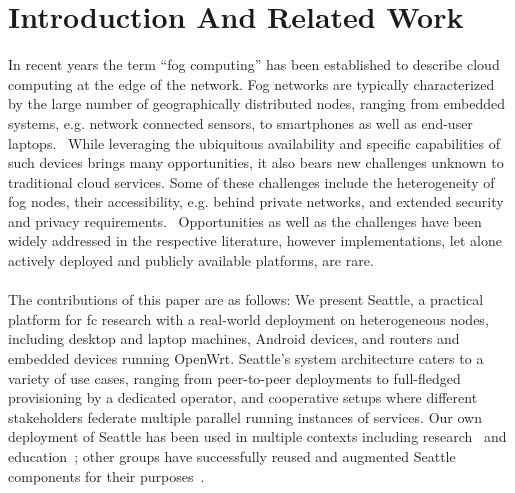 \section{Introduction And Related Work}
In recent years the term ``fog computing'' has been established to describe
cloud computing at the edge of the network. Fog networks are typically
characterized by the large number of geographically distributed nodes, ranging
from embedded systems, e.g. network connected
sensors, to smartphones as well as end-user laptops.~\cite{Bonomi:2012:FCR:2342509.2342513,Yi:2015:SFC:2757384.2757397}
While leveraging the
ubiquitous availability and specific capabilities of such devices brings
many opportunities, it also bears new challenges unknown to traditional cloud
services. Some of these challenges include the heterogeneity of fog nodes,
their accessibility, e.g. behind private networks, and extended security and
privacy requirements.~\cite{botta_integration_2016}
Opportunities as well as the challenges have been widely addressed in the
respective literature, however implementations, let alone actively deployed and
publicly available platforms, are rare. \\ \\


The contributions of this paper are as follows:
We present Seattle, a practical platform for \gls{fc} research
with a real-world deployment on heterogeneous nodes,
including desktop and laptop machines, Android devices,
and routers and embedded devices running OpenWrt.
Seattle's system architecture caters to a variety of use cases,
ranging from peer-to-peer deployments to full-fledged
provisioning by a dedicated operator, and cooperative setups
where different stakeholders federate multiple parallel running
instances of services.
Our own deployment of Seattle has been used in multiple contexts
including research~\cite{li2015fence,rafetseder2013sensorium,zhuang2014sensibility,Eisl1010:Service,Tuts1010:Sustained,collares2011smart,zhuang2015privacy,cappos2014blursense,7133607} and education~\cite{Wallace_CCSC_2011,Cappos_CCSCCP_2010,Cappos_CCSCNW_2009,Cappos_SIGCSE_2014,Hooshangi_SIGCSE_2015};
other groups have successfully reused and augmented Seattle components
for their purposes~\cite{chard2010social,chard12ssc,caton2014social,muller2014tomato,tomato,eittenberger2012doubtless,zhuang2012distributed,zhuang2014taking,tredger2013building}.
